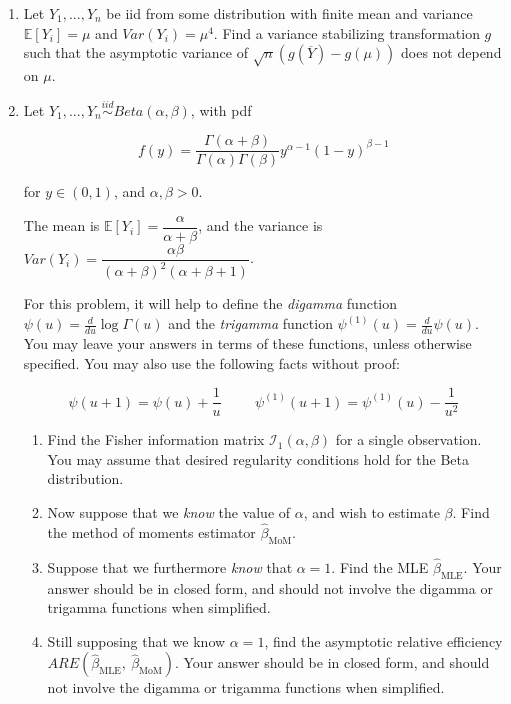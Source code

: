 \documentclass[11pt]{article}
\begin{document}
\begin{enumerate}
\bigskip

\item Let $Y_1,...,Y_n$ be iid from some distribution with finite mean and variance $\mathbb{E}[Y_i] = \mu$ and $Var(Y_i) = \mu^4$. Find a variance stabilizing transformation $g$ such that the asymptotic variance of $\sqrt{n}(g(\overline{Y}) - g(\mu))$ does not depend on $\mu$.

\bigskip

\item Let $Y_1,...,Y_n \overset{iid}{\sim} Beta(\alpha, \beta)$, with pdf

$$f(y) = \frac{\Gamma(\alpha + \beta)}{\Gamma(\alpha) \Gamma(\beta)}y^{\alpha - 1} (1 - y)^{\beta - 1}$$

for $y \in (0, 1)$, and $\alpha, \beta > 0$. 

The mean is $\mathbb{E}[Y_i] = \dfrac{\alpha}{\alpha + \beta}$, and the variance is $Var(Y_i) = \dfrac{\alpha \beta}{(\alpha + \beta)^2(\alpha + \beta + 1)}$.

For this problem, it will help to define the \textit{digamma} function $\psi(u) = \frac{d}{du} \log \Gamma(u)$ and the \textit{trigamma} function $\psi^{(1)}(u) = \frac{d}{du} \psi(u)$. You may leave your answers in terms of these functions, unless otherwise specified. You may also use the following facts without proof:

$$\psi(u + 1) = \psi(u) + \frac{1}{u} \hspace{1cm} \psi^{(1)}(u + 1) = \psi^{(1)}(u) - \frac{1}{u^2}$$

\begin{enumerate}
\item Find the Fisher information matrix $\mathcal{I}_1(\alpha, \beta)$ for a single observation. You may assume that desired regularity conditions hold for the Beta distribution.

\item Now suppose that we \textit{know} the value of $\alpha$, and wish to estimate $\beta$. Find the method of moments estimator $\widehat{\beta}_{\text{MoM}}$.

\item Suppose that we furthermore \textit{know} that $\alpha = 1$. Find the MLE $\widehat{\beta}_{\text{MLE}}$. Your answer should be in closed form, and should not involve the digamma or trigamma functions when simplified.

\item Still supposing that we know $\alpha = 1$, find the asymptotic relative efficiency $ARE(\widehat{\beta}_{\text{MLE}}, \ \widehat{\beta}_{\text{MoM}})$. Your answer should be in closed form, and should not involve the digamma or trigamma functions when simplified.


\end{enumerate}
\end{enumerate}
\end{document}
